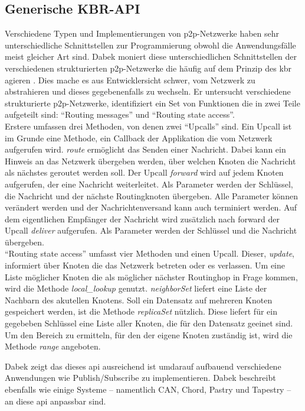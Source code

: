 \subsection{Generische KBR-API}
\label{chap:grundlagen:api}
Verschiedene Typen und Implementierungen von p2p-Netzwerke haben sehr unterschiedliche Schnittstellen zur Programmierung obwohl die Anwendungsfälle meist gleicher Art sind. Dabek moniert diese unterschiedlichen Schnittstellen der verschiedenen strukturierten p2p-Netzwerke die häufig auf dem Prinzip des \ac{kbr} agieren \cite{Dabek2003Towards}. Dies mache es aus Entwicklersicht schwer, vom Netzwerk zu abstrahieren und dieses gegebenenfalls zu wechseln. Er untersucht verschiedene strukturierte p2p-Netzwerke, identifiziert ein Set von Funktionen die in zwei Teile aufgeteilt sind: ``Routing messages'' und ``Routing state access''.\\
Erstere umfassen drei Methoden, von denen zwei ``Upcalls'' sind. Ein Upcall ist im Grunde eine Methode, ein Callback der Applikation die vom Netzwerk aufgerufen wird. \emph{route} ermöglicht das Senden einer Nachricht. Dabei kann ein Hinweis an das Netzwerk übergeben werden, über welchen Knoten die Nachricht als nächstes geroutet werden soll. Der Upcall \emph{forward} wird auf jedem Knoten aufgerufen, der eine Nachricht weiterleitet. Als Parameter werden der Schlüssel, die Nachricht und der nächste Routingknoten übergeben. Alle Parameter können verändert werden und der Nachrichtenversand kann auch terminiert werden. Auf dem eigentlichen Empfänger der Nachricht wird zusätzlich nach forward der Upcall \emph{deliver} aufgerufen. Als Parameter werden der Schlüssel und die Nachricht übergeben.\\
``Routing state access'' umfasst vier Methoden und einen Upcall. Dieser, \emph{update}, informiert über Knoten die das Netzwerk betreten oder es verlassen. Um eine Liste möglicher Knoten die als möglicher nächster Routinghop in Frage kommen, wird die Methode \emph{local\_lookup} genutzt. \emph{neighborSet} liefert eine Liste der Nachbarn des akutellen Knotens. Soll ein Datensatz auf mehreren Knoten gespeichert werden, ist die Methode \emph{replicaSet} nützlich. Diese liefert für ein gegebeben Schlüssel eine Liste aller Knoten, die für den Datensatz geeinet sind. Um den Bereich zu ermitteln, für den der eigene Knoten zuständig ist, wird die Methode \emph{range} angeboten.

Dabek zeigt das dieses \acf{api} ausreichend ist umdarauf aufbauend verschiedene Anwendungen wie Publish/Subscribe zu implementieren. Dabek beschreibt ebenfalls wie einige Systeme -- namentlich CAN, Chord, Pastry und Tapestry -- an diese \ac{api} anpassbar sind.

